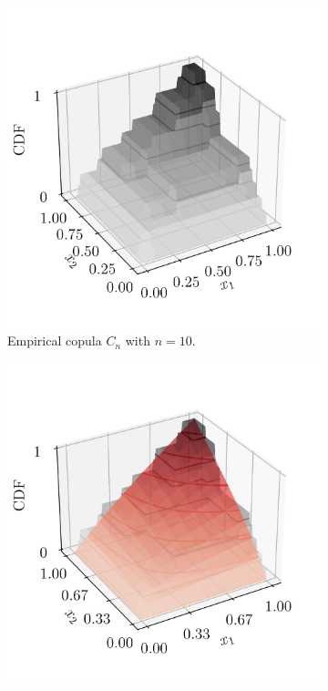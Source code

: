 \begin{figure}
    \begin{subfigure}[b]{0.49\textwidth}
        \centering
        \includegraphics[width=\linewidth]{../numerical_experiments/chapter3/figures/empirical_copula.png}
        \caption{Empirical copula $C_n$ with $n=10$.}
    \end{subfigure}
    \begin{subfigure}[b]{0.49\textwidth}
        \centering
        \includegraphics[width=\linewidth]{../numerical_experiments/chapter3/figures/ebc_m3.png}

\end{subfigure}
\end{figure}

